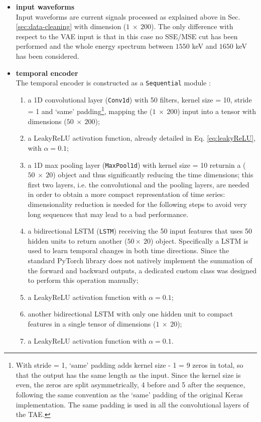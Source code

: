\begin{itemize}
    \item \textbf{input waveforms}\\
    Input waveforms are current signals processed as explained above in Sec. \ref{sec:data-cleaning} with dimension ($1~\times~200$). The only difference with respect to the \ac{VAE} input is that in this case no \ac{SSE}/\ac{MSE} cut has been performed and the whole energy spectrum between $1550$ keV and $1650$ keV has been considered. 
    \item \textbf{temporal encoder}\\
    The temporal encoder is constructed as a \texttt{Sequential} module \cite{torchSequential}:
    \begin{enumerate}
        \item a 1D convolutional layer (\texttt{Conv1d}) with 50 filters, kernel size = 10, stride = 1 and ‘same’ padding\footnote{With stride = 1, ‘same’ padding adds kernel size - 1 = 9 zeros in total, so that the output has the same length as the input. Since the kernel size is even, the zeros are split asymmetrically, 4 before and 5 after the sequence, following the same convention as the ‘same’ padding of the original Keras implementation. The same padding is used in all the convolutional layers of the \ac{TAE}.}, mapping the ($1~\times~200$) input into a tensor with dimensions ($50~\times~200$);
        \item a LeakyReLU activation function, already detailed in Eq. \ref{eq:leakyReLU}, with $\alpha = 0.1$;
        \item a 1D max pooling layer (\texttt{MaxPool1d}) with kernel size = 10 returnin a ($50~\times~20$) object and thus significantly reducing the time dimensions; this first two layers, i.e. the convolutional and the pooling layers, are needed in order to obtain a more compact representation of time series: dimensionality reduction is needed for the following steps to avoid very long sequences that may lead to a bad performance.
        \item a bidirectional \ac{LSTM} (\texttt{LSTM}) receiving the 50 input features that uses 50 hidden units to return another ($50\times~20$) object. Specifically a \ac{LSTM} is used to learn temporal changes in both time directions. Since the standard PyTorch library does not natively implement the summation of the forward and backward outputs, a dedicated custom class was designed to perform this operation manually;
        \item a LeakyReLU activation function with $\alpha = 0.1$;
        \item another bidirectional \ac{LSTM} with only one hidden unit to compact features in a single tensor of dimensions ($1~\times~20$);
        \item a LeakyReLU activation function with $\alpha = 0.1$.
    \end{enumerate}


\end{itemize}
